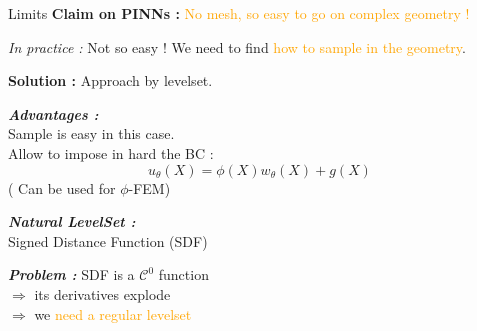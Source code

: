 \begin{frame}{Limits}
	\textbf{Claim on PINNs :} \textcolor{orange}{No mesh, so easy to go on complex geometry !}
	
	\warning \textit{In practice :} Not so easy ! We need to find \textcolor{orange}{how to sample in the geometry}.
	
	\vspace{8pt}
	
	\textbf{Solution :} Approach by levelset. \footnotesize\citep{sukumar_exact_2022}\normalsize
	
	\begin{center}
	\end{center}
	
	\vspace{5pt}

	\begin{center}
		\begin{minipage}{0.44\linewidth}
			\textbf{\textit{Advantages :}} \\
			 Sample is easy in this case. \\
			 Allow to impose in hard the BC :
			\vspace{-5pt}
			\begin{equation*}
				u_\theta(X)=\phi(X)w_\theta(X)+g(X)
			\end{equation*}
			( Can be used for $\phi$-FEM)
		\end{minipage}
		\begin{minipage}{0.44\linewidth}
			\textbf{\textit{Natural LevelSet :}} \\
			Signed Distance Function (SDF)
			
			\vspace{5pt}
			\textbf{\textit{Problem :}} SDF is a $\mathcal{C}^0$ function  \\
			$\Rightarrow$ its derivatives explode \\
			$\Rightarrow$ we \textcolor{orange}{need a regular levelset}
		\end{minipage}
	\end{center}
\end{frame}


